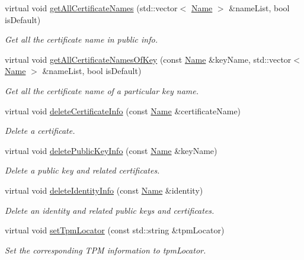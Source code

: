 \begin{DoxyCompactItemize}
virtual void \hyperlink{classndn_1_1security_1_1DummyPublicInfo_aabd7d276c43193c6e670637e95aaff25}{get\+All\+Certificate\+Names} (std\+::vector$<$ \hyperlink{classndn_1_1Name}{Name} $>$ \&name\+List, bool is\+Default)
\begin{DoxyCompactList}\small\item\em Get all the certificate name in public info. \end{DoxyCompactList}\item 
virtual void \hyperlink{classndn_1_1security_1_1DummyPublicInfo_a3d5bd6a802978239dcf757f6486f02d8}{get\+All\+Certificate\+Names\+Of\+Key} (const \hyperlink{classndn_1_1Name}{Name} \&key\+Name, std\+::vector$<$ \hyperlink{classndn_1_1Name}{Name} $>$ \&name\+List, bool is\+Default)
\begin{DoxyCompactList}\small\item\em Get all the certificate name of a particular key name. \end{DoxyCompactList}\item 
virtual void \hyperlink{classndn_1_1security_1_1DummyPublicInfo_a4c98507bec36106ab34a239ccd1e481f}{delete\+Certificate\+Info} (const \hyperlink{classndn_1_1Name}{Name} \&certificate\+Name)
\begin{DoxyCompactList}\small\item\em Delete a certificate. \end{DoxyCompactList}\item 
virtual void \hyperlink{classndn_1_1security_1_1DummyPublicInfo_aedae4f2c862fea01a19ef5a71e880d70}{delete\+Public\+Key\+Info} (const \hyperlink{classndn_1_1Name}{Name} \&key\+Name)
\begin{DoxyCompactList}\small\item\em Delete a public key and related certificates. \end{DoxyCompactList}\item 
virtual void \hyperlink{classndn_1_1security_1_1DummyPublicInfo_ae886c2fce3be0e3aa97f70605487a9bc}{delete\+Identity\+Info} (const \hyperlink{classndn_1_1Name}{Name} \&identity)
\begin{DoxyCompactList}\small\item\em Delete an identity and related public keys and certificates. \end{DoxyCompactList}\item 
virtual void \hyperlink{classndn_1_1security_1_1DummyPublicInfo_ae6291a5b5f0233c543a365cf15d93696}{set\+Tpm\+Locator} (const std\+::string \&tpm\+Locator)
\begin{DoxyCompactList}\small\item\em Set the corresponding T\+PM information to {\ttfamily tpm\+Locator}. \end{DoxyCompactList}\item 

\end{DoxyCompactItemize}
